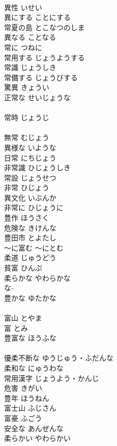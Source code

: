 \documentclass[8pt]{extreport}
\begin{document}
\begin{CJK}{UTF8}{min}
\\	異性	いせい	
\\	異にする	ことにする	
\\	常夏の島	とこなつのしま	
\\	異なる	ことなる	
\\	常に	つねに	
\\	常用する	じょうようする	
\\	常識	じょうしき	
\\	常備する	じょうびする	
\\	驚異	きょうい	
\\	正常な	せいじょうな	
\\	[漢語]
\\	常時	じょうじ	
\\	[漢語]
\\	無常	むじょう	
\\	異様な	いような	
\\	日常	にちじょう	
\\	非常識	ひじょうしき	
\\	常設	じょうせつ	
\\	非常	ひじょう	
\\	異文化	いぶんか	
\\	非常に	ひじょうに	
\\	豊作	ほうさく	
\\	危険な	きけんな	
\\	豊田市	とよたし	
\\	～に富む	～にとむ	
\\	柔道	じゅうどう	
\\	貧富	ひんぷ	
\\	柔らかな	やわらかな	
\\	な-
\\	豊かな	ゆたかな	
\\	[和語]
\\	富山	とやま	
\\	富	とみ	
\\	豊富な	ほうふな	
\\	[漢語]
\\	優柔不断な	ゆうじゅう・ふだんな	
\\	柔和な	にゅうわな	
\\	常用漢字	じょうよう・かんじ	
\\	危害	きがい	
\\	豊年	ほうねん	
\\	富士山	ふじさん	
\\	富豪	ふごう	
\\	安全な	あんぜんな	
\\	柔らかい	やわらかい	

\end{CJK}
\end{document}
